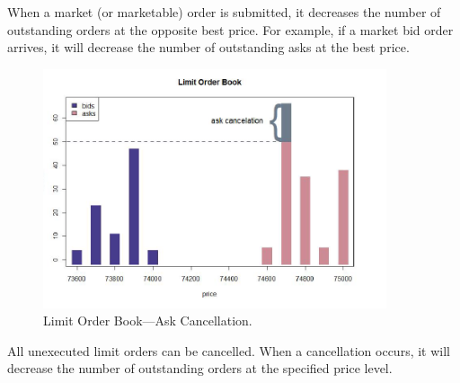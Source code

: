 When a market (or marketable) order is submitted, it decreases the number of outstanding orders at the opposite best price. For example, if a market bid order arrives, it will decrease the number of outstanding asks at the best price.
	\begin{figure}[!ht]
	   \centering
	   \includegraphics[width=0.9\textwidth]{chapters/chapter_trading_fund/figures/limitbk3.png} 
	   \caption{Limit Order Book---Ask Cancellation. \label{fig:limbk3}}
	\end{figure}
All unexecuted limit orders can be cancelled. When a cancellation occurs, it will decrease the number of outstanding orders at the specified price level. \\


